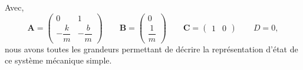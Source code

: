 Avec,
\[
    \boldsymbol{A}=
    \begin{pmatrix} 
        0 & 1 \\[1em]
        -\dfrac{k}{m} & -\dfrac{b}{m}
    \end{pmatrix}\quad\quad
    \boldsymbol{B}=
    \begin{pmatrix} 0 \\[1em] \dfrac{1}{m} \end{pmatrix}\quad\quad
    \boldsymbol{C}=\begin{pmatrix} 1 & 0 \end{pmatrix}\quad\quad D=0,
\]
nous avons toutes les grandeurs permettant de décrire la représentation d'état
de ce système mécanique simple.
